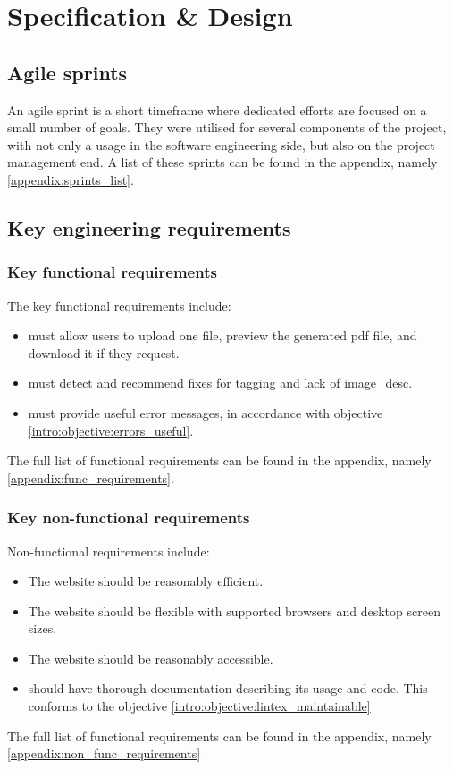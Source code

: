 
\section{Specification \& Design}\label{specification_design}
\subsection{Agile sprints}
An agile sprint is a short timeframe where dedicated efforts are focused on a small number of goals. They were utilised for several components of the project, with not only a usage in the software engineering side, but also on the project management end. A list of these sprints can be found in the appendix, namely \cref{appendix:sprints_list}.

\subsection{Key engineering requirements}
\subsubsection{Key functional requirements}
The key functional requirements include:
\begin{itemize}
\item \lintexspaced must allow users to upload one \latexspaced file, preview the generated \acrshort{pdf} file, and download it if they request.
\item \lintexspaced must detect and recommend fixes for \gls{tagging} and lack of \gls{image_desc}.
\item \lintexspaced must provide useful error messages, in accordance with objective \ref{intro:objective:errors_useful}.
\end{itemize}
The full list of functional requirements can be found in the appendix, namely \cref{appendix:func_requirements}.

\subsubsection{Key non-functional requirements}
Non-functional requirements include:
\begin{itemize}
\item The website should be reasonably efficient.
\item The website should be flexible with supported browsers and desktop screen sizes.
\item The website should be reasonably accessible.
\item \lintexspaced should have thorough documentation describing its usage and code. This conforms to the objective \ref{intro:objective:lintex_maintainable}
\end{itemize}
The full list of functional requirements can be found in the appendix, namely \cref{appendix:non_func_requirements}

